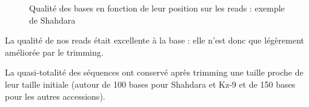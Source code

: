 \documentclass[a4paper]{article}
\begin{document}
\begin{figure}[!ht]
\centering

 

\label{quality}
\caption{Qualité des bases en fonction de leur position sur les reads : exemple de Shahdara}
\end{figure}

La qualité de nos reads était excellente à la base : elle n'est donc que légèrement améliorée par le trimming. 

La quasi-totalité des séquences ont conservé après trimming une taille proche de leur taille initiale  (autour de 100 bases pour Shahdara et Kz-9 et de 150 bases pour les autres accessions). 
\end{document}
